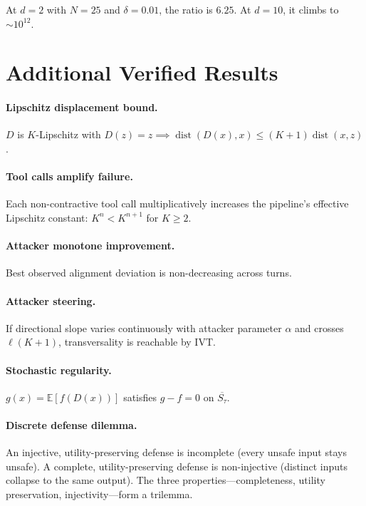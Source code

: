 \documentclass[11pt]{article}
\newcommand{\cl}[1]{\overline{#1}}
\newcommand{\dist}{\operatorname{dist}}
\begin{document}
At $d=2$ with $N=25$ and $\delta=0.01$, the ratio is $6.25$.
At $d=10$, it climbs to $\sim 10^{12}$.


\section{Additional Verified Results}
\label{app:additional}

\paragraph{Lipschitz displacement bound.}
$D$ is $K$-Lipschitz with $D(z) = z \implies
\dist(D(x), x) \leq (K+1)\dist(x,z)$.

\paragraph{Tool calls amplify failure.}
Each non-contractive tool call multiplicatively increases the pipeline's
effective Lipschitz constant: $K^n < K^{n+1}$ for $K \geq 2$.

\paragraph{Attacker monotone improvement.}
Best observed alignment deviation is non-decreasing across turns.

\paragraph{Attacker steering.}
If directional slope varies continuously with attacker parameter $\alpha$
and crosses $\ell(K+1)$, transversality is reachable by IVT.

\paragraph{Stochastic regularity.}
$g(x) = \mathbb{E}[f(D(x))]$ satisfies $g - f = 0$ on $\cl{S_\tau}$.

\paragraph{Discrete defense dilemma.}
An injective, utility-preserving defense is incomplete (every unsafe
input stays unsafe). A complete, utility-preserving defense is
non-injective (distinct inputs collapse to the same output).
The three properties---completeness, utility preservation,
injectivity---form a trilemma.
\end{document}
